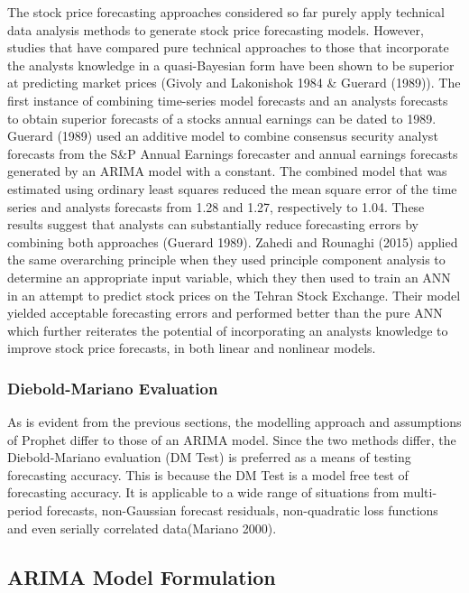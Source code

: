 \documentclass[12pt,a4paper]{article}
\numberwithin{equation}{section}
\numberwithin{figure}{section}
\numberwithin{table}{section}
\begin{document}
The stock price forecasting approaches considered so far purely apply
technical data analysis methods to generate stock price forecasting
models. However, studies that have compared pure technical approaches to
those that incorporate the analysts knowledge in a quasi-Bayesian form
have been shown to be superior at predicting market prices (Givoly and
Lakonishok 1984 \& Guerard (1989)). The first instance of combining
time-series model forecasts and an analysts forecasts to obtain superior
forecasts of a stocks annual earnings can be dated to 1989. Guerard
(1989) used an additive model to combine consensus security analyst
forecasts from the S\&P Annual Earnings forecaster and annual earnings
forecasts generated by an ARIMA model with a constant. The combined
model that was estimated using ordinary least squares reduced the mean
square error of the time series and analysts forecasts from 1.28 and
1.27, respectively to 1.04. These results suggest that analysts can
substantially reduce forecasting errors by combining both approaches
(Guerard 1989). Zahedi and Rounaghi (2015) applied the same overarching
principle when they used principle component analysis to determine an
appropriate input variable, which they then used to train an ANN in an
attempt to predict stock prices on the Tehran Stock Exchange. Their
model yielded acceptable forecasting errors and performed better than
the pure ANN which further reiterates the potential of incorporating an
analysts knowledge to improve stock price forecasts, in both linear and
nonlinear models.

\subsubsection{Diebold-Mariano
Evaluation}\label{diebold-mariano-evaluation}

As is evident from the previous sections, the modelling approach and
assumptions of Prophet differ to those of an ARIMA model. Since the two
methods differ, the Diebold-Mariano evaluation (DM Test) is preferred as
a means of testing forecasting accuracy. This is because the DM Test is
a model free test of forecasting accuracy. It is applicable to a wide
range of situations from multi-period forecasts, non-Gaussian forecast
residuals, non-quadratic loss functions and even serially correlated
data(Mariano 2000).

\subsection{ARIMA Model Formulation}\label{arima-model-formulation}
\end{document}
